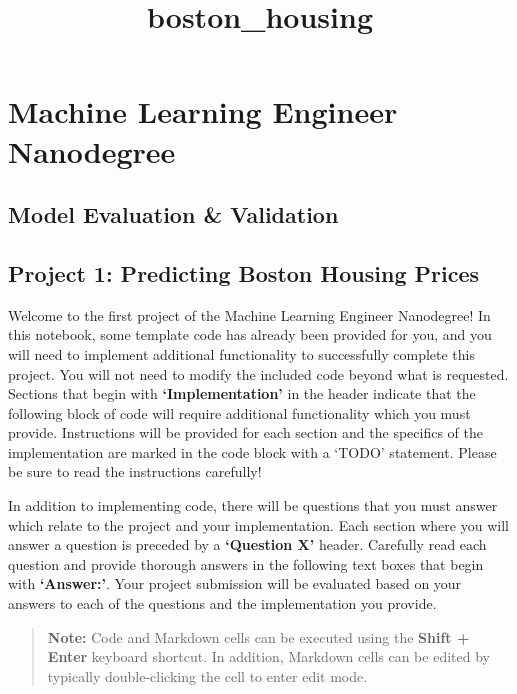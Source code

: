\documentclass{article}
\title{boston\_housing}
\begin{document}
    
    
    \maketitle
    
    

    
    \section{Machine Learning Engineer
Nanodegree}\label{machine-learning-engineer-nanodegree}

\subsection{Model Evaluation \&
Validation}\label{model-evaluation-validation}

\subsection{Project 1: Predicting Boston Housing
Prices}\label{project-1-predicting-boston-housing-prices}

Welcome to the first project of the Machine Learning Engineer
Nanodegree! In this notebook, some template code has already been
provided for you, and you will need to implement additional
functionality to successfully complete this project. You will not need
to modify the included code beyond what is requested. Sections that
begin with \textbf{`Implementation'} in the header indicate that the
following block of code will require additional functionality which you
must provide. Instructions will be provided for each section and the
specifics of the implementation are marked in the code block with a
`TODO' statement. Please be sure to read the instructions carefully!

In addition to implementing code, there will be questions that you must
answer which relate to the project and your implementation. Each section
where you will answer a question is preceded by a \textbf{`Question X'}
header. Carefully read each question and provide thorough answers in the
following text boxes that begin with \textbf{`Answer:'}. Your project
submission will be evaluated based on your answers to each of the
questions and the implementation you provide.

\begin{quote}
\textbf{Note:} Code and Markdown cells can be executed using the
\textbf{Shift + Enter} keyboard shortcut. In addition, Markdown cells
can be edited by typically double-clicking the cell to enter edit mode.
\end{quote}
\end{document}
